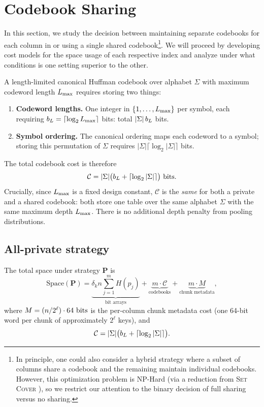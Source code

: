 \section{Codebook Sharing}

In this section, we study the decision between maintaining separate codebooks for each column in \sys or using a single shared codebook\footnote{In principle, one could also consider a hybrid strategy where a subset of columns share a codebook and the remaining maintain individual codebooks. However, this optimization problem is NP-Hard (via a reduction from \textsc{Set Cover} \cite{karp1972}), so we restrict our attention to the binary decision of full sharing versus no sharing.}. We will proceed by developing cost models for the space usage of each respective index and analyze under what conditions is one setting superior to the other. 

A length-limited canonical Huffman codebook over alphabet $\Sigma$ with maximum
codeword length $L_{\max}$ requires storing two things:
\begin{enumerate}
    \item \textbf{Codeword lengths.} One integer in $\{1, \ldots, L_{\max}\}$ per symbol,
          each requiring $b_L = \lceil\log_2 L_{\max}\rceil$ bits: total
          $|\Sigma|\,b_L$ bits.
    \item \textbf{Symbol ordering.} The canonical ordering maps each codeword to a
          symbol; storing this permutation of $\Sigma$ requires
          $|\Sigma|\lceil\log_2|\Sigma|\rceil$ bits.
\end{enumerate}
The total codebook cost is therefore
\[
    \mathcal{C} = |\Sigma|\bigl(b_L + \lceil\log_2|\Sigma|\rceil\bigr) \text{ bits}.
\]
Crucially, since $L_{\max}$ is a fixed design constant, $\mathcal{C}$ is the \emph{same}
for both a private and a shared codebook: both store one table over the same alphabet
$\Sigma$ with the same maximum depth $L_{\max}$. There is no additional depth penalty from
pooling distributions.

\subsection{All-private strategy}

The total space under strategy $\mathbf{P}$ is
\[
    \mathrm{Space}(\mathbf{P})
    = \underbrace{\delta_k n \sum_{j=1}^{m} H(p_j)}_{\text{bit arrays}}
    + \underbrace{m \cdot \mathcal{C}}_{\text{codebooks}}
    + \underbrace{m \cdot M}_{\text{chunk metadata}},
\]
where $M = (n / 2^\ell) \cdot 64\text{ bits}$ is the per-column chunk metadata cost
(one 64-bit word per chunk of approximately $2^\ell$ keys), and
\[
    \mathcal{C} = |\Sigma|\bigl(b_L + \lceil\log_2|\Sigma|\rceil\bigr).
\]

